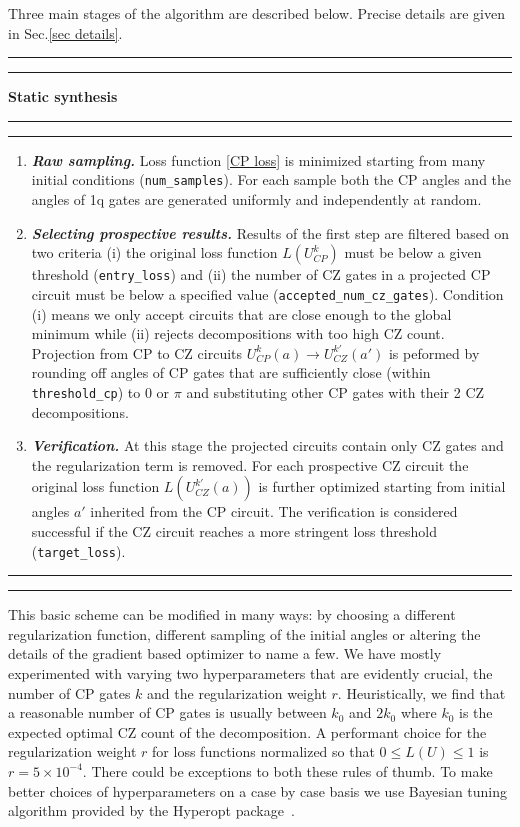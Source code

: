 \documentclass[draft, twocolumn, amsfonts, amssymb, aps, nofootinbib]{revtex4-2}
\newcommand{\CZ}{\textsf{CZ }}
\newcommand{\CP}{\textsf{CP }}
\newcommand{\package}[1]{\textrm {#1 }}
\newcommand{\param}[1]{\texttt{#1}}
\begin{document}
Three main stages of the algorithm are described below. Precise details are given in Sec.\ref{sec details}.
\\[6pt]
\hrule
\hrule
\vspace{6pt}
{\large\textbf{\qquad Static synthesis}}
\vspace{6pt}
\hrule
\hrule
\begin{enumerate}
\item \textit{\textbf{ Raw sampling.}} Loss function \eqref{CP loss} is minimized starting from many initial conditions (\param{num\_samples}). For each sample both the \CP angles and the angles of 1q gates are generated uniformly and independently at random.
\item \textit{\textbf{Selecting prospective results.}} Results of the first step are filtered based on two criteria (i) the original loss function $L(U^k_{CP})$ must be below a given threshold (\param{entry\_loss}) and (ii) the number of \CZ gates in a projected \CP circuit must be below a specified value (\param{accepted\_num\_cz\_gates}). Condition (i) means we only accept circuits that are close enough to the global minimum while (ii) rejects decompositions with too high \CZ count. Projection from \CP to \CZ circuits $U_{CP}^k(a)\to U_{CZ}^{k'}(a')$ is peformed by rounding off angles of \CP gates that are sufficiently close (within \param{threshold\_cp}) to $0$ or $\pi$ and substituting other \CP gates with their 2 \CZ decompositions.
\item \textit{\textbf{Verification.}} At this stage the projected circuits contain only \CZ gates and the regularization term is removed. For each prospective \CZ circuit the original loss function $L(U_{CZ}^{k'}(a))$ is further optimized starting from initial angles $a'$ inherited from the \CP circuit. The verification is considered successful if the \CZ circuit reaches a more stringent loss threshold (\param{target\_loss}).
\end{enumerate}
\hrule
\hrule
\vspace{20pt}

This basic scheme can be modified in many ways: by choosing a different regularization function, different sampling of the initial angles or altering the details of the gradient based optimizer to name a few. We have mostly experimented with varying two hyperparameters that are evidently crucial, the number of \CP gates $k$ and the regularization weight $r$. Heuristically, we find that a reasonable number of \CP gates is usually between $k_0$ and $2k_0$ where $k_0$ is the expected optimal \CZ count of the decomposition. A performant choice for the regularization weight $r$ for loss functions normalized so that $0\le L(U) \le 1$ is $r=5\times 10^{-4}$. There could be exceptions to both these rules of thumb. To make better choices of hyperparameters on a case by case basis we use Bayesian tuning algorithm provided by the \package{Hyperopt} package~\cite{hyperopt}.
\end{document}
